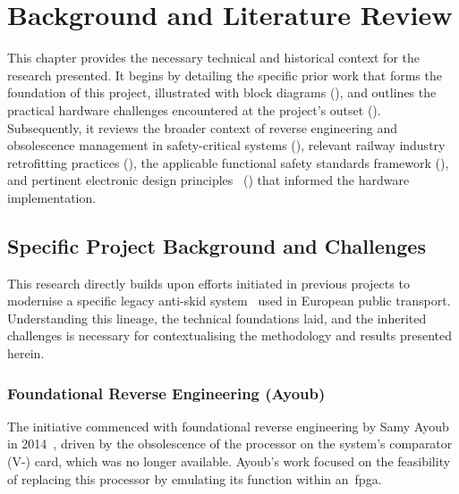 \chapter{Background and Literature Review}
\label{chap:background_lit_review}

This chapter provides the necessary technical and historical context for the research presented. It begins by detailing the specific prior work that forms the foundation of this project, illustrated with block diagrams (), and outlines the practical hardware challenges encountered at the project's outset (). Subsequently, it reviews the broader context of reverse engineering and obsolescence management in safety-critical systems (), relevant railway industry retrofitting practices (), the applicable functional safety standards framework (), and pertinent electronic design principles~\cite{jones2004} () that informed the hardware implementation.

\section{Specific Project Background and Challenges}
\label{sec:specific_background}

This research directly builds upon efforts initiated in previous projects to modernise a specific legacy anti-skid system~\cite{rexroth1992wsp} used in European public transport. Understanding this lineage, the technical foundations laid, and the inherited challenges is necessary for contextualising the methodology and results presented herein.

\subsection{Foundational Reverse Engineering (Ayoub)}
\label{subsec:ayoub_vorarbeit}

The initiative commenced with foundational reverse engineering by Samy Ayoub in 2014~\cite{ayoub2014}, driven by the obsolescence of the processor on the system's comparator (V-) card, which was no longer available. Ayoub's work focused on the feasibility of replacing this processor by emulating its function within an~\gls{fpga}.

